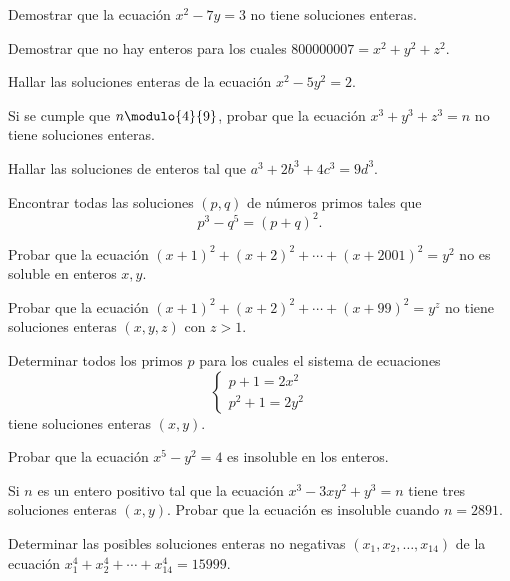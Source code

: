 \begin{exercise}
    Demostrar que la ecuación $x^2 - 7y = 3$ no tiene soluciones enteras.
\end{exercise}

\begin{exercise}
    Demostrar que no hay enteros para los cuales $800000007 = x^2 + y^2 + z^2$.
\end{exercise}

\begin{exercise}
    Hallar las soluciones enteras de la ecuación $x^2 - 5y^2 = 2$.
\end{exercise}

\begin{exercise}
    Si se cumple que $n \modulo{4}{9}$, probar que la ecuación $x^3 + y^3 + z^3 = n$ no tiene soluciones enteras.
\end{exercise}

\begin{exercise}
    Hallar las soluciones de enteros tal que $a^3 + 2b^3 + 4c^3 = 9d^3$.
\end{exercise}

\begin{exercise}
    Encontrar todas las soluciones $(p,q)$ de números primos tales que
    \[
        p^3 - q^5 = (p + q)^2.
    \]
\end{exercise}

\begin{problem}
    Probar que la ecuación $(x + 1)^2 + (x + 2)^2 + \cdots + (x + 2001)^2 = y^2$ no es soluble en enteros $x,y$.
\end{problem}

\begin{problem}
    Probar que la ecuación $(x + 1)^2 + (x + 2)^2 + \cdots + (x + 99)^2 = y^z$ no tiene soluciones enteras $(x,y,z)$ con $z > 1$.
\end{problem}

\begin{problem}
    Determinar todos los primos $p$ para los cuales el sistema de ecuaciones
    \[
        \begin{cases}
            p + 1 = 2x^2\\
            p^2 + 1 = 2y^2
        \end{cases}
    \]
    tiene soluciones enteras $(x,y)$.
\end{problem}

\begin{problem}
    Probar que la ecuación $x^5 - y^2 = 4$ es insoluble en los enteros.
\end{problem}

\begin{problem}
    Si $n$ es un entero positivo tal que la ecuación $x^3 - 3xy^2 + y^3 = n$ tiene tres soluciones enteras $(x,y)$.
    Probar que la ecuación es insoluble cuando $n = 2891$.
\end{problem}

\begin{problem}
    Determinar las posibles soluciones enteras no negativas $(x_1, x_2, \ldots, x_{14})$ de la ecuación $x_1^4 + x_2^4 + \cdots + x_{14}^4 = 15999$.
\end{problem}